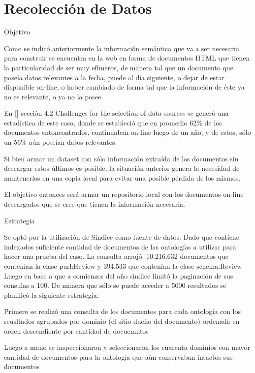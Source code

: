 \chapter{Recolección de Datos}
\label{chapter:recoleccion}

Objetivo 

Como se indicó anteriormente la información semántica que va a ser necesaria para construir se encuentra en la web en forma de documentos 
HTML que tienen la particularidad de ser muy efímeros, de manera tal que un documento que poseía datos relevantes a la fecha,
puede al día siguiente, o dejar de estar disponible on-line, o haber cambiado de forma tal que la información de éste ya no es 
relevante, o ya no la posee. 

En [] sección 4.2 Challenges for the selection of data sources se generó una estadística de este caso, donde se estableció que 
en promedio 62\% de los documentos entoncontrados, continuaban on-line luego de un año, y de estos, sólo un 56\% aún poseían 
datos relevantes. 

Si bien armar un dataset con sólo información extraída de los documentos sin descargar estos últimos es posible, la situación anterior 
genera la necesidad de mantenerlos en una copia local para evitar una posible pérdida de los mismos. 

El objetivo entonces será armar un repositorio local con los documentos on-line descargados que se cree que tienen la información 
necesaria. 

 

Estrategia

Se optó por la utilización de Sindice como fuente de datos. Dado que contiene indexados suficiente cantidad de documentos de las 
ontologías a utilizar para hacer una prueba del caso.
La consulta arrojó: 10.216.632 documentos que contenían la clase purl:Review y 394.533 que contenían la clase schema:Review
Luego en base a que a comienzos del año sindice limitó la paginación de sus consulas a 100. De manera que sólo se puede acceder a 5000 
resultados se planificó la siguiente estrategia:

Primero se realizó una consulta de los documentos para cada ontología con los reusltados agrupados por dominio (el sitio dueño del documento) ordenada en orden descendiente por cantidad de docuemntos 

Luego a mano se inspeccionaron y seleccionaron los cuarenta dominios con mayor cantidad de documentos para la ontología que aún conservaban intactos sus documentos

